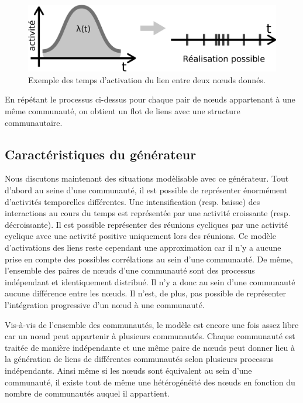 \begin{figure}
\centering
\includegraphics[width=0.7\linewidth]{img/Qualite/Activation}
\caption{Exemple des temps d'activation du lien entre deux n\oe uds donnés.}
\label{fig:qualite_Activation}
\end{figure}


En répétant le processus ci-dessus pour chaque pair de n\oe uds appartenant à une même communauté, on obtient un flot de liens avec une structure communautaire.

\subsection{Caractéristiques du générateur}

Nous discutons maintenant des situations modèlisable avec ce générateur.
Tout d'abord au seine d'une communauté, il est possible de représenter énormément d'activités temporelles différentes.
Une intensification (resp. baisse) des interactions au cours du temps est représentée par une activité croissante (resp. décroissante).
Il est possible représenter des réunions cycliques par une activité cyclique avec une activité positive uniquement lors des réunions. 
Ce modèle d'activations des liens reste  cependant une approximation car il n'y a aucune prise en compte des possibles corrélations au sein d'une communauté.
De même, l'ensemble des paires de n\oe uds d'une communauté sont des processus indépendant et identiquement distribué.
Il n'y a donc au sein d'une communauté aucune différence entre les n\oe uds.
Il n'est, de plus, pas possible de représenter l'intégration progressive d'un n\oe ud à une communauté.

Vis-à-vis de l'ensemble des communautés, le modèle est encore une fois assez libre car un n\oe ud peut appartenir à plusieurs communautés.
Chaque communauté est traitée de manière indépendante et une même paire de n\oe uds peut donner lieu à la génération de liens de différentes communautés selon plusieurs processus indépendants.
Ainsi même si les n\oe uds sont équivalent au sein d'une communauté, il existe tout de même une hétérogénéité des n\oe uds en fonction du nombre de communautés auquel il appartient.

\bigskip

